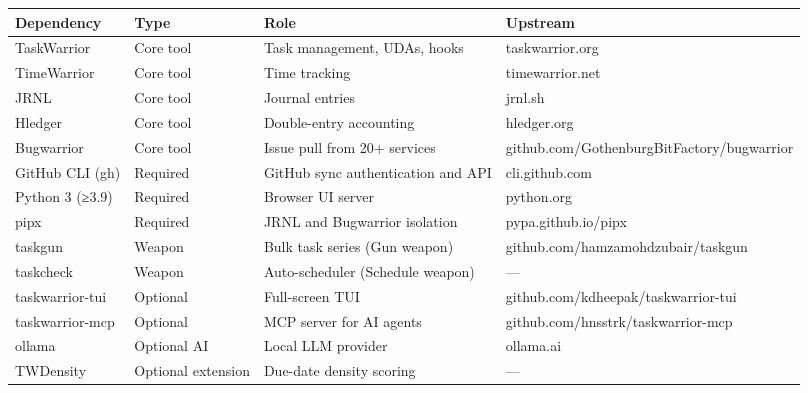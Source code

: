 \documentclass[11pt, a4paper, DIV=14]{scrartcl}
\begin{document}
{\def\LTcaptype{none} %
\begin{longtable}[]{@{}
  >{\raggedright\arraybackslash}p{}
  >{\raggedright\arraybackslash}p{}
  >{\raggedright\arraybackslash}p{}
  >{\raggedright\arraybackslash}p{}@{}}
\toprule\noalign{}
\begin{minipage}[b]{\linewidth}\raggedright
Dependency
\end{minipage} & \begin{minipage}[b]{\linewidth}\raggedright
Type
\end{minipage} & \begin{minipage}[b]{\linewidth}\raggedright
Role
\end{minipage} & \begin{minipage}[b]{\linewidth}\raggedright
Upstream
\end{minipage} \\
\midrule\noalign{}
\endhead
\bottomrule\noalign{}
\endlastfoot
TaskWarrior & Core tool & Task management, UDAs, hooks &
taskwarrior.org \\
TimeWarrior & Core tool & Time tracking & timewarrior.net \\
JRNL & Core tool & Journal entries & jrnl.sh \\
Hledger & Core tool & Double-entry accounting & hledger.org \\
Bugwarrior & Core tool & Issue pull from 20+ services &
github.com/GothenburgBitFactory/bugwarrior \\
GitHub CLI (gh) & Required & GitHub sync authentication and API &
cli.github.com \\
Python 3 (≥3.9) & Required & Browser UI server & python.org \\
pipx & Required & JRNL and Bugwarrior isolation & pypa.github.io/pipx \\
taskgun & Weapon & Bulk task series (Gun weapon) &
github.com/hamzamohdzubair/taskgun \\
taskcheck & Weapon & Auto-scheduler (Schedule weapon) & --- \\
taskwarrior-tui & Optional & Full-screen TUI &
github.com/kdheepak/taskwarrior-tui \\
taskwarrior-mcp & Optional & MCP server for AI agents &
github.com/hnsstrk/taskwarrior-mcp \\
ollama & Optional AI & Local LLM provider & ollama.ai \\
TWDensity & Optional extension & Due-date density scoring & --- \\
\end{longtable}
}
\end{document}
